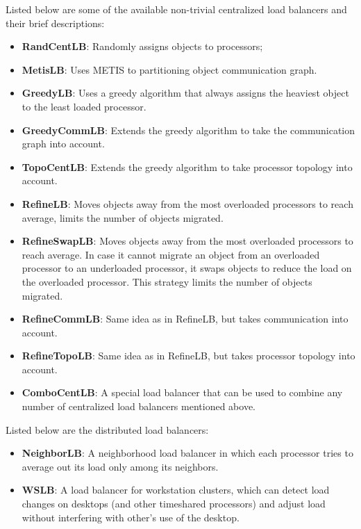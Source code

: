 Listed below are some of the available non-trivial centralized load balancers
and their brief descriptions:
\begin{itemize}
\item {\bf RandCentLB}:   Randomly assigns objects to processors;
\item {\bf MetisLB}:      Uses METIS\texttrademark\hspace{0mm} to partitioning object communication graph.
\item {\bf GreedyLB}:   Uses a greedy algorithm that always assigns the heaviest object to the least loaded processor.
\item {\bf GreedyCommLB}:  Extends the greedy algorithm to take the communication graph into account.
\item {\bf TopoCentLB}:    Extends the greedy algorithm to take processor topology into account.
\item {\bf RefineLB}:     Moves objects away from the most overloaded processors to reach average, limits the number of objects migrated.
\item {\bf RefineSwapLB}:     Moves objects away from the most overloaded processors
to reach average. In case it cannot migrate an object from an overloaded
processor to an underloaded processor, it swaps objects to reduce the load on
the overloaded processor. This strategy limits the number of objects migrated.
\item {\bf RefineCommLB}:     Same idea as in RefineLB, but takes communication into account.
\item {\bf RefineTopoLB}:       Same idea as in RefineLB, but takes processor topology into account.
\item {\bf ComboCentLB}:  A special load balancer that can be used to combine any number of centralized load balancers mentioned above.
\end{itemize}

Listed below are the distributed load balancers:
\begin{itemize}
\item {\bf NeighborLB}:   A neighborhood load balancer in which each processor tries to average out its load only among its neighbors.
\item {\bf WSLB}:   A load balancer for workstation clusters, which can detect load changes on desktops (and other timeshared processors) and adjust load without interfering with other's use of the desktop.
\end{itemize}

